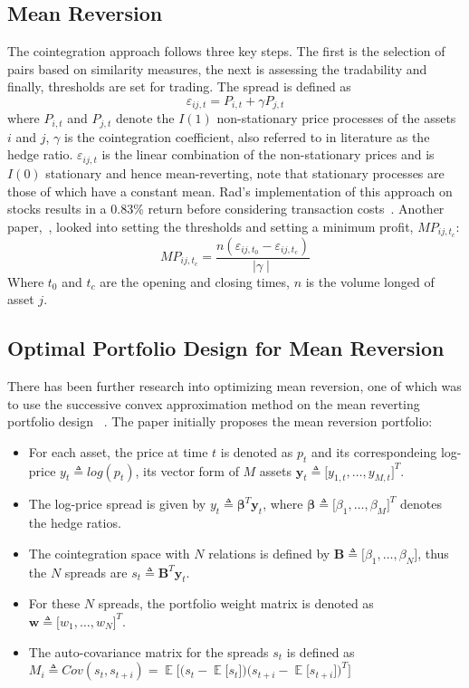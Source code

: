 \subsection{Mean Reversion}
The cointegration approach follows three key steps. The first is the selection of pairs based on similarity measures, the next is assessing the tradability and finally, thresholds are set for trading. The spread is defined as $$\varepsilon_{i j,t} = P_{i,t} + \gamma P_{j,t}$$ where $P_{i,t}$ and $P_{j,t}$ denote the $I(1)$ non-stationary price processes of the assets $i$ and $j$, $\gamma$ is the cointegration coefficient, also referred to in literature as the hedge ratio. $\varepsilon_{i j,t}$ is the linear combination of the non-stationary prices and is $I(0)$ stationary and hence mean-reverting, note that stationary processes are those of which have a constant mean. Rad's implementation of this approach on stocks results in a 0.83\% return before considering transaction costs~\cite{RadLowFaff}. Another paper,~\cite{lossProtection}, looked into setting the thresholds and setting a minimum profit, $MP_{ij,t_c}$: $$MP_{ij,t_c} = \frac{n(\varepsilon_{i j,t_0} - \varepsilon_{i j,t_c})}{ \mid \gamma \mid}$$ Where $t_0$ and $t_c$ are the opening and closing times, $n$ is the volume longed of asset $j$.

\subsection{Optimal Portfolio Design for Mean Reversion}
There has been further research into optimizing mean reversion, one of which was to use the successive convex approximation method on the mean reverting portfolio design ~\cite{ZipingZhao2019OMPW}. The paper initially proposes the mean reversion portfolio:
\begin{itemize}
    \itemsep0em
    \item For each asset, the price at time $t$ is denoted as $p_t$ and its correspondeing log-price $y_t \triangleq log(p_t)$, its vector form of $M$ assets $\mathbf{y}_t \triangleq \big[ y_{1,t}, \dots ,y_{M,t} \big]^T$.
    \item The log-price spread is given by $y_t \triangleq \mathbf{\beta}^T\mathbf{y}_t$, where $\mathbf{\beta} \triangleq \big[ \beta_1, \dots ,\beta_M \big]^T$ denotes the hedge ratios.
    \item The cointegration space with $N$ relations is defined by $\mathbf{B} \triangleq \big[ \beta_1, \dots ,\beta_N \big]$, thus the $N$ spreads are $s_t \triangleq \mathbf{B}^T\mathbf{y}_t$.
    \item For these $N$ spreads, the portfolio weight matrix is denoted as $\mathbf{w} \triangleq \big[ w_1, \dots ,w_N \big]^T$.
    \item The auto-covariance matrix for the spreads $s_t$ is defined as \\ ${M_i \triangleq Cov(s_t, s_{t+i}) = \mathop{\mathbb{E}} \big[ \big( s_t - \mathop{\mathbb{E}} \big[ s_t \big]\big) \big( s_{t+i} - \mathop{\mathbb{E}} \big[ s_{t+i} \big]\big)^T \big]}$
\end{itemize}

